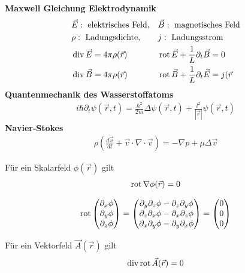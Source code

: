 \begin{Beispiel}
{\bf Maxwell Gleichung Elektrodynamik}
 \begin{align*}
  &\vec{E} : \text{ elektrisches Feld}, && \vec{B} : \text{ magnetisches Feld}\\
  &\rho : \text{ Ladungsdichte}, &&j : \text{ Ladungsstrom}\\
  &\operatorname{div} \vec{E} = 4\pi\rho(\vec{r}) && \operatorname{rot} \vec{E} + \frac{1}{L}\partial_t
  \vec{B} = 0\\
   &\operatorname{div} \vec{B} = 4\pi\rho(\vec{r}) && \operatorname{rot} \vec{B} + \frac{1}{L}\partial_t
   \vec{E} = j(\vec{r}
 \end{align*}
{\bf Quantenmechanik des Wasserstoffatoms}
\begin{align*}
 i\hbar\partial_t \psi(\vec{r},t) = \frac{\hbar^2}{2m}\Delta\psi(\vec{r},t) + \frac{l^2}{|\vec{r}|}\psi(\vec{r},t)
\end{align*}
{\bf Navier-Stokes}
\begin{align*}
 \rho\left(\frac{d\vec{v}}{dt} +\vec{v}\cdot\nabla\cdot\vec{v}\right) = -\nabla p + \mu \Delta\vec{v}
\end{align*}
\end{Beispiel}

\begin{Bemerkung}
Für ein Skalarfeld $\phi(\vec{r})$ gilt
\begin{align*}
\operatorname{rot} \nabla \phi(\vec{r}) = 0
\end{align*}
\begin{info}
\begin{align*}
\operatorname{rot} \begin{pmatrix}\partial_x \phi \\ \partial_y \phi \\
\partial_z \phi\end{pmatrix} = \begin{pmatrix}\partial_y\partial_z \phi -
\partial_z\partial_y \phi \\ \partial_z\partial_x \phi - \partial_x\partial_z
\phi \\ \partial_x\partial_y \phi - \partial_y\partial_x \phi\end{pmatrix} = \begin{pmatrix}0\\0\\0\end{pmatrix}
\end{align*}
\end{info}
\par
Für ein Vektorfeld $\vec{A}(\vec{r})$ gilt
\begin{align*}
\operatorname{div} \operatorname{rot} \vec{A}(\vec{r}) = 0
\end{align*}
\end{Bemerkung}


